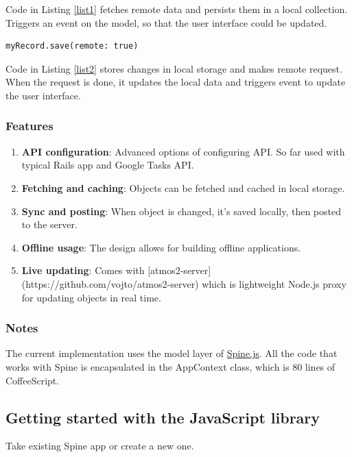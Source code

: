 Code in Listing \ref{list1} fetches remote data and persists them in a local collection. Triggers an event on the model, so that the user interface could be updated.

\begin{lstlisting}[caption=Saving object,label=list2]
myRecord.save(remote: true)
\end{lstlisting}
    
Code in Listing \ref{list2} stores changes in local storage and makes remote request. When the request is done, it updates the local data and triggers event to update the user interface.

\subsubsection{Features}

\begin{enumerate}
\item \textbf{API configuration}: Advanced options of configuring API. So far used with typical Rails app and Google Tasks API.
\item \textbf{Fetching and caching}: Objects can be fetched and cached in local storage.
\item \textbf{Sync and posting}: When object is changed, it's saved locally, then posted to the server.
\item \textbf{Offline usage}: The design allows for building offline applications.
\item \textbf{Live updating}: Comes with [atmos2-server](https://github.com/vojto/atmos2-server) which is lightweight Node.js proxy for updating objects in real time.
\end{enumerate}

\subsubsection{Notes}

The current implementation uses the model layer of \href{http://spinejs.com}{Spine.js}. All the code that works with Spine is encapsulated in the AppContext class, which is 80 lines of CoffeeScript.

\subsection{Getting started with the JavaScript library}

Take existing Spine app or create a new one.

